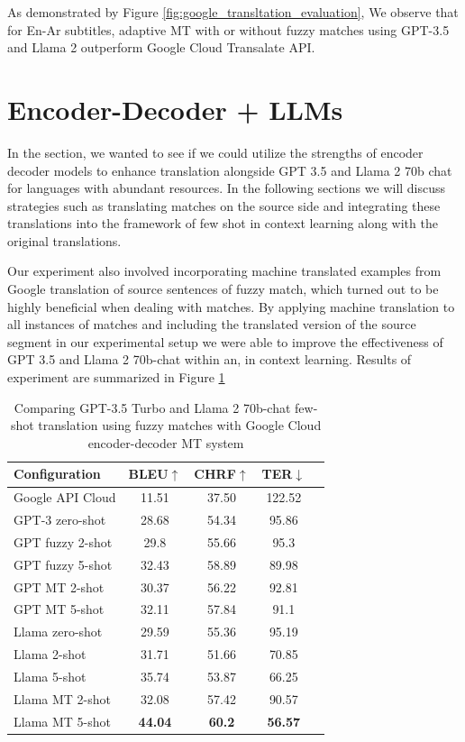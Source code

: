\documentclass[twocolumn]{article}
\begin{document}
As demonstrated by Figure \ref{fig:google_transltation_evaluation}, We observe that for En-Ar subtitles, adaptive MT with or without fuzzy matches using GPT-3.5 and Llama 2 outperform Google Cloud Transalate API.


\section{Encoder-Decoder + LLMs}

In the section, we wanted to see if we could utilize the strengths of encoder decoder models to enhance translation alongside GPT 3.5 and Llama 2 70b chat for languages with abundant resources. In the following sections we will discuss strategies such as translating matches on the source side and integrating these translations into the framework of few shot in context learning along with the original translations.

Our experiment also involved incorporating machine translated examples from Google translation of source sentences of fuzzy match, which turned out to be highly beneficial when dealing with matches. By applying machine translation to all instances of matches and including the translated version of the source segment in our experimental setup we were able to improve the effectiveness of GPT 3.5 and Llama 2 70b-chat within an, in context learning. Results of experiment are summarized in Figure \ref{table:language_systems}


\begin{table}[h]
	\centering
	\begin{tabular}{|l|c|c|c|c|}
		\hline
		 \textbf{Configuration} & \textbf{BLEU$\uparrow$} & \textbf{CHRF$\uparrow$} & \textbf{TER$\downarrow$}\\
		\hline
		Google API Cloud & 11.51 & 37.50 & 122.52  \\
		
		\hline
		GPT-3 zero-shot & 28.68 & 54.34 & 95.86 \\
		GPT fuzzy 2-shot & 29.8 & 55.66 & 95.3 \\
		GPT fuzzy 5-shot & 32.43 & 58.89 & 89.98  \\
		
		GPT MT 2-shot & 30.37 & 56.22 & 92.81 \\
		GPT MT 5-shot & 32.11 & 57.84 & 91.1  \\
	
		\hline
		Llama zero-shot & 29.59 & 55.36 & 95.19 \\
		Llama 2-shot & 31.71 & 51.66 & 70.85 \\
		Llama 5-shot & 35.74 & 53.87 & 66.25  \\
		
		Llama MT 2-shot & 32.08 & 57.42 & 90.57 \\
		Llama MT 5-shot & \textbf{44.04} & \textbf{60.2} & \textbf{56.57} \\
		
		\hline

	\end{tabular}
	\caption{Comparing GPT-3.5 Turbo and Llama 2 70b-chat few-shot translation using fuzzy matches with Google Cloud encoder-decoder MT system}
	\label{table:language_systems}
\end{table}
\end{document}
